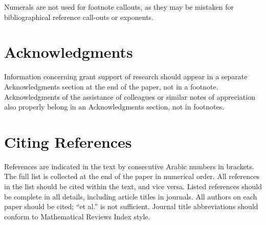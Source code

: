 \documentclass{ijuc}
\begin{document}
Numerals are not used for footnote callouts,
as they may be mistaken for bibliographical reference call-outs or exponents.


\section{Acknowledgments}

Information concerning grant
support of research should appear in a separate Acknowledgments section at
the end of the paper, not in a footnote. Acknowledgments of the assistance of
colleagues or similar notes of appreciation also properly belong in an
Acknowledgments section, not in footnotes.


\section{Citing References}

References are indicated in the text by consecutive Arabic numbers
in brackets. The full list is collected at the end of the paper in numerical
order. All references in the list should be cited within the text, and vice
versa. Listed references should be complete in all details, including article
titles in journals. All authors on each paper should be cited; ``et al.'' is not sufficient.
Journal title abbreviations should conform to Mathematical Reviews
Index style.




\appendix 
\end{document}
